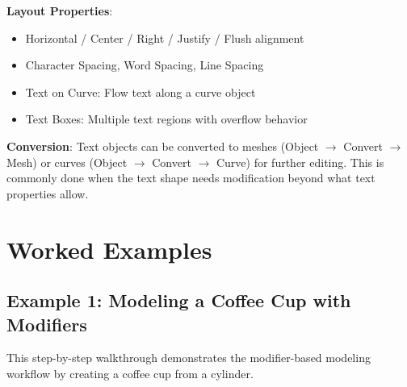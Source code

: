 \textbf{Layout Properties}:
\begin{itemize}[leftmargin=2em]
  \item Horizontal / Center / Right / Justify / Flush alignment
  \item Character Spacing, Word Spacing, Line Spacing
  \item Text on Curve: Flow text along a curve object
  \item Text Boxes: Multiple text regions with overflow behavior
\end{itemize}

\textbf{Conversion}: Text objects can be converted to meshes (Object $\rightarrow$ Convert $\rightarrow$ Mesh) or curves (Object $\rightarrow$ Convert $\rightarrow$ Curve) for further editing. This is commonly done when the text shape needs modification beyond what text properties allow.



\section{Worked Examples}
\label{sec:workedexamples}

\subsection{Example 1: Modeling a Coffee Cup with Modifiers}
\label{sec:cupexample}

This step-by-step walkthrough demonstrates the modifier-based modeling workflow by creating a coffee cup from a cylinder.

